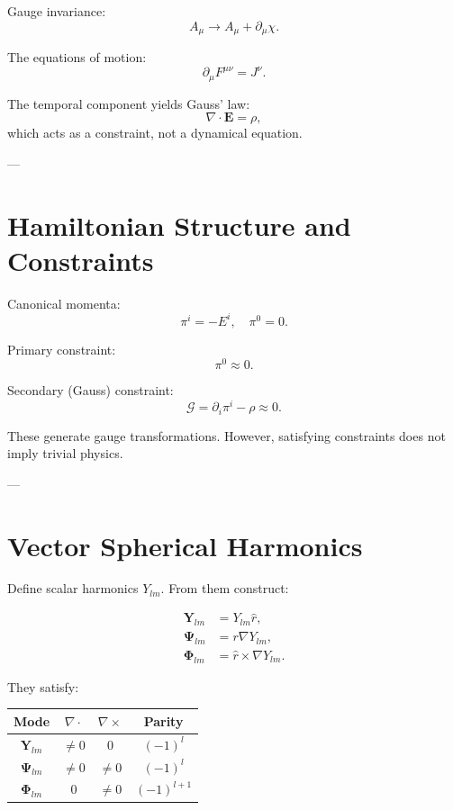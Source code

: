 \documentclass[11pt]{article}
\begin{document}
Gauge invariance:
\begin{equation}
A_\mu \rightarrow A_\mu + \partial_\mu \chi .
\end{equation}

The equations of motion:
\begin{equation}
\partial_\mu F^{\mu\nu} = J^\nu.
\end{equation}

The temporal component yields Gauss’ law:
\begin{equation}
\nabla \cdot \mathbf{E} = \rho,
\end{equation}
which acts as a constraint, not a dynamical equation.

---

\section{Hamiltonian Structure and Constraints}

Canonical momenta:
\begin{equation}
\pi^i = -E^i, \quad \pi^0 = 0.
\end{equation}

Primary constraint:
\begin{equation}
\pi^0 \approx 0.
\end{equation}

Secondary (Gauss) constraint:
\begin{equation}
\mathcal{G} = \partial_i \pi^i - \rho \approx 0.
\end{equation}

These generate gauge transformations.  
However, satisfying constraints does not imply trivial physics.

---

\section{Vector Spherical Harmonics}

Define scalar harmonics \(Y_{lm}\). From them construct:

\begin{align}
\mathbf{Y}_{lm} &= Y_{lm}\hat r, \\
\mathbf{\Psi}_{lm} &= r\nabla Y_{lm}, \\
\mathbf{\Phi}_{lm} &= \hat r \times \nabla Y_{lm}.
\end{align}

They satisfy:

\begin{center}
\begin{tabular}{c|c|c|c}
Mode & $\nabla\cdot$ & $\nabla\times$ & Parity \\ \hline
$\mathbf{Y}_{lm}$ & $\neq0$ & $0$ & $(-1)^l$ \\
$\mathbf{\Psi}_{lm}$ & $\neq0$ & $\neq0$ & $(-1)^l$ \\
$\mathbf{\Phi}_{lm}$ & $0$ & $\neq0$ & $(-1)^{l+1}$
\end{tabular}
\end{center}
\end{document}
